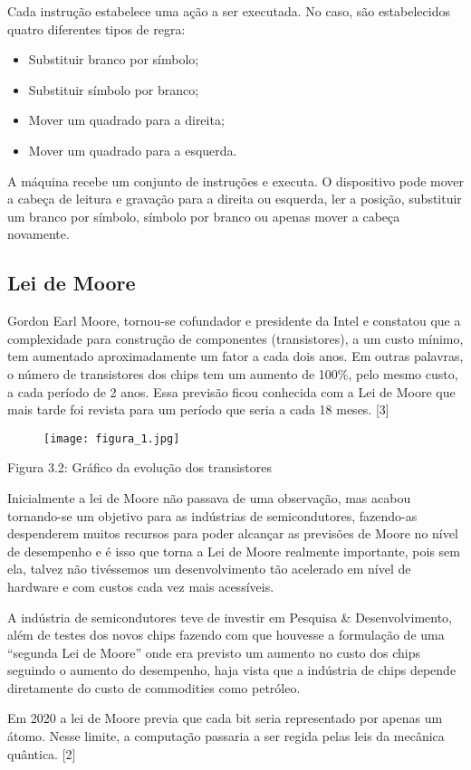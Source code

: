 \documentclass[12pt, a4paper, oneside]{article}
\begin{document}
Cada instrução estabelece uma ação a ser executada. No caso, são estabelecidos quatro
diferentes tipos de regra:
\begin{itemize}
\item Substituir branco por símbolo;
\item Substituir símbolo por branco;
\item Mover um quadrado para a direita;
\item Mover um quadrado para a esquerda.
\end{itemize}
\par A máquina recebe um conjunto de instruções e executa. O dispositivo pode mover a
cabeça de leitura e gravação para a direita ou esquerda, ler a posição, substituir um branco por símbolo, símbolo por branco ou apenas mover a cabeça novamente.

\subsection{Lei de Moore}
\par Gordon Earl Moore, tornou-se cofundador e presidente da Intel
e constatou que a complexidade para construção de componentes (transistores), a um custo
mínimo, tem aumentado aproximadamente um fator a cada dois anos. Em outras palavras,
o número de transistores dos chips tem um aumento de 100\%, pelo mesmo custo, a cada
período de 2 anos. Essa previsão ficou conhecida com a Lei de Moore que mais tarde
foi revista para um período que seria a cada 18 meses. [3]
\newpage

\begin{figure}
\centering 
\texttt{[image: figura\_1.jpg]} 

\end{figure}

Figura 3.2: Gráfico da evolução dos transistores\\

\par Inicialmente a lei de Moore não passava de uma observação, mas acabou tornando-se um objetivo para as indústrias de semicondutores, fazendo-as despenderem muitos recursos para poder alcançar as previsões de Moore no nível de desempenho e é isso que torna a Lei de Moore realmente importante, pois sem ela, talvez não tivéssemos um desenvolvimento tão acelerado em nível de hardware e com custos cada vez mais acessíveis.
\par A indústria de semicondutores teve de investir em Pesquisa \& Desenvolvimento, além de testes dos novos chips fazendo com que houvesse a formulação de uma “segunda Lei de Moore” onde era previsto um aumento no custo dos chips seguindo o aumento do desempenho, haja vista que a indústria de chips depende diretamente do custo de commodities como petróleo. 
\par Em 2020 a lei de Moore previa que cada bit seria representado por apenas um átomo. Nesse limite, a computação passaria a ser regida pelas leis da mecânica quântica. [2]
\end{document}
